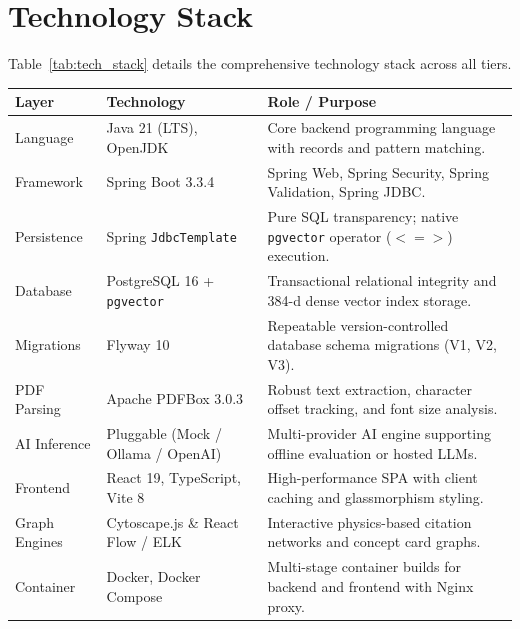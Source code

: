 \documentclass[11pt,a4paper,titlepage]{report}
\begin{document}
\section{Technology Stack}
Table~\ref{tab:tech_stack} details the comprehensive technology stack across all tiers.

\begin{center}
\label{tab:tech_stack}
\vspace{3pt}
\begin{tabularx}{\textwidth}{llX}
\toprule
\textbf{Layer} & \textbf{Technology} & \textbf{Role / Purpose} \\
\midrule
Language & Java 21 (LTS), OpenJDK & Core backend programming language with records and pattern matching. \\
Framework & Spring Boot 3.3.4 & Spring Web, Spring Security, Spring Validation, Spring JDBC. \\
Persistence & Spring \texttt{JdbcTemplate} & Pure SQL transparency; native \texttt{pgvector} operator ($<=>$) execution. \\
Database & PostgreSQL 16 + \texttt{pgvector} & Transactional relational integrity and 384-d dense vector index storage. \\
Migrations & Flyway 10 & Repeatable version-controlled database schema migrations (V1, V2, V3). \\
PDF Parsing & Apache PDFBox 3.0.3 & Robust text extraction, character offset tracking, and font size analysis. \\
AI Inference & Pluggable (Mock / Ollama / OpenAI) & Multi-provider AI engine supporting offline evaluation or hosted LLMs. \\
Frontend & React 19, TypeScript, Vite 8 & High-performance SPA with client caching and glassmorphism styling. \\
Graph Engines & Cytoscape.js \& React Flow / ELK & Interactive physics-based citation networks and concept card graphs. \\
Container & Docker, Docker Compose & Multi-stage container builds for backend and frontend with Nginx proxy. \\
\bottomrule
\end{tabularx}
\end{center}
\end{document}
